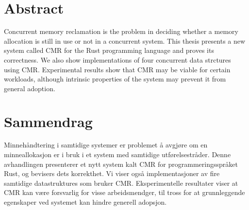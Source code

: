 \par\break\null%
\vsize%
{\centering\section*{Abstract}}

Concurrent memory reclamation is the problem in deciding whether a memory allocation is still in
use or not in a concurrent system.  This thesis presents a new system called CMR for the Rust
programming language and proves its correctness.  We also show implementations of four concurrent
data strctures using CMR\@.  Experimental results show that CMR may be viable for certain
workloads, although intrinsic properties of the system may prevent it from general adoption.


\vfill%
{\centering\section*{Sammendrag}}

Minnehåndtering i samtidige systemer er problemet å avgjøre om en minneallokasjon er i bruk i et
system med samtidige utførelsestråder. Denne avhandlingen presenterer et nytt system kalt CMR for
programmeringsspråket Rust, og bevisers dets korrekthet. Vi viser også implementasjoner av fire
samtidige datastruktures som bruker CMR\@. Eksperimentelle resultater viser at CMR kan være
forsvarlig for visse arbeidsmendger, til tross for at grunnleggende egenskaper ved systemet kan
hindre generell adopsjon.

\vfill\break%
